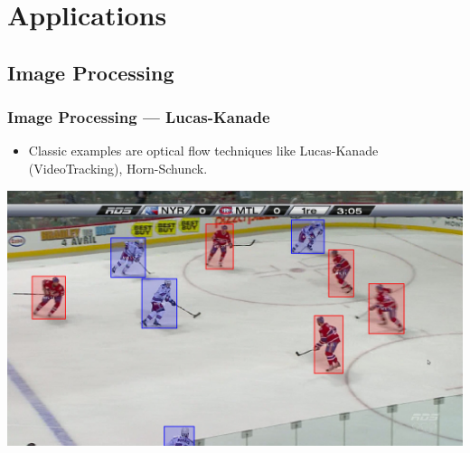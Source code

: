 




\section{Applications}

\subsection{Image Processing}

\begin{frame}
\frametitle{Image Processing --- Lucas-Kanade}
  \begin{itemize}
  \item[] {
Classic examples are optical flow techniques like Lucas-Kanade (VideoTracking), Horn-Schunck.
  }
  \end{itemize}


\includegraphics[scale=0.15]{right2.png}
\end{frame}


